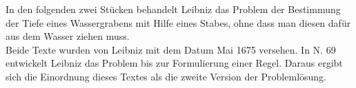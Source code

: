   \vspace{8mm}
  \footnotesize        			
\pstart In den folgenden zwei St\"{u}cken behandelt Leibniz das Problem der Bestimmung der Tiefe eines Wassergrabens mit Hilfe eines Stabes, ohne dass man diesen daf\"{u}r aus dem Wasser ziehen muss.\\ Beide Texte wurden von Leibniz mit dem Datum Mai 1675 versehen. In N. 69 entwickelt Leibniz das Problem bis zur Formulierung einer Regel. Daraus ergibt sich die Einordnung dieses Textes als die zweite Version der Probleml\"{o}sung.\pend
  \vspace{10mm}
  \normalsize